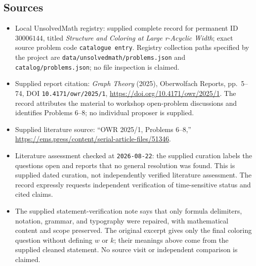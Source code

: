 \documentclass[11pt]{article}
\begin{document}
\subsection{Sources}
\begin{itemize}
\item Local UnsolvedMath registry: supplied complete record for permanent ID \(30006144\), titled \emph{Structure and Coloring at Large r-Acyclic Width}; exact source problem code \texttt{catalogue entry}. Registry collection paths specified by the project are \texttt{data/unsolvedmath/problems.json} and \texttt{catalog/problems.json}; no file inspection is claimed.
\item Supplied report citation: \emph{Graph Theory} (2025), Oberwolfach Reports, pp.~5--74, DOI \texttt{10.4171/owr/2025/1}, \url{https://doi.org/10.4171/owr/2025/1}. The record attributes the material to workshop open-problem discussions and identifies Problems 6--8; no individual proposer is supplied.
\item Supplied literature source: ``OWR 2025/1, Problems 6--8,'' \url{https://ems.press/content/serial-article-files/51346}.
\item Literature assessment checked at \texttt{2026-08-22}: the supplied curation labels the questions open and reports that no general resolution was found. This is supplied dated curation, not independently verified literature assessment. The record expressly requests independent verification of time-sensitive status and cited claims.
\item The supplied statement-verification note says that only formula delimiters, notation, grammar, and typography were repaired, with mathematical content and scope preserved. The original excerpt gives only the final coloring question without defining \(w\) or \(k\); their meanings above come from the supplied cleaned statement. No source visit or independent comparison is claimed.
\end{itemize}
\end{document}
